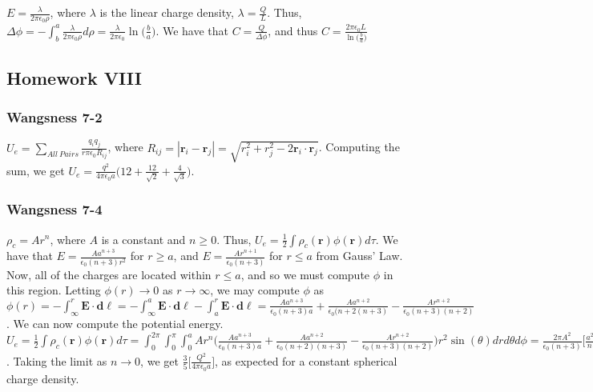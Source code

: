 \documentclass[oneside]{book}
\theoremstyle{definition}
\newcommand*\B[1]{\mathbf{#1}}
\begin{document}
$E=\frac{\lambda}{2\pi \epsilon_0 \rho}$, where $\lambda$ is the linear charge density, $\lambda = \frac{Q}{L}$. Thus, $\Delta\phi = - \int_{b}^{a} \frac{\lambda}{2\pi \epsilon_0\rho}d\rho = \frac{\lambda}{2\pi \epsilon_0}\ln\big(\frac{b}{a}\big)$. We have that $C=\frac{Q}{\Delta\phi}$, and thus $C = \frac{2\pi \epsilon_0 L}{\ln\big(\frac{b}{a}\big)}$


\subsection*{Homework VIII}

\subsubsection{Wangsness 7-2}

$U_e = \underset{All\ Pairs}\sum\frac{q_i q_j}{r\pi \epsilon_0 R_{ij}}$, where $R_{ij} = |\B{r}_i-\B{r}_j| = \sqrt{r_i^2+r_j^2 -2\B{r}_i\cdot \B{r}_j}$. Computing the sum, we get $U_e = \frac{q^2}{4\pi \epsilon_0 a}\big(12 + \frac{12}{\sqrt{2}}+\frac{4}{\sqrt{3}}\big)$.

\begin{figure}[!h]
  \centering
\end{figure}

\subsubsection{Wangsness 7-4}

$\rho_c = Ar^n$, where $A$ is a constant and $n\geq 0$. Thus, $U_e = \frac{1}{2} \int \rho_c(\B{r})\phi(\B{r})d\tau$. We have that $E = \frac{Aa^{n+3}}{\epsilon_0 (n+3)r^2}$ for $r\geq a$, and $E=\frac{Ar^{n+1}}{\epsilon_0(n+3)}$ for $r\leq a$ from Gauss' Law. Now, all of the charges are located within $r\leq a$, and so we must compute $\phi$ in this region. Letting $\phi(r)\rightarrow 0$ as $r\rightarrow \infty$, we may compute $\phi$ as $\phi(r) = -\int_{\infty}^{r}\B{E}\cdot \B{d\ell} = -\int_{\infty}^{a} \B{E}\cdot \B{d\ell} - \int_{a}^{r}\B{E}\cdot \B{d\ell} = \frac{Aa^{n+3}}{\epsilon_0(n+3)a}+\frac{Aa^{n+2}}{\epsilon_0(n+2(n+3)}-\frac{Ar^{n+2}}{\epsilon_0(n+3)(n+2)}$. We can now compute  the potential energy. $U_e =\frac{1}{2}\int \rho_c(\B{r})\phi(\B{r})d\tau = \int_{0}^{2\pi} \int_{0}^{\pi}\int_{0}^{a} A r^n \bigg(\frac{Aa^{n+3}}{\epsilon_0(n+3)a}+\frac{Aa^{n+2}}{\epsilon_0(n+2)(n+3)}-\frac{Ar^{n+2}}{\epsilon_0(n+3)(n+2)}\bigg)r^2 \sin(\theta)dr d\theta d\phi = \frac{2\pi A^2}{\epsilon_0 (n+3)}\bigg[\frac{a^{2n+5}}{n+3}+\frac{a^{2n+5}}{(n+2)(n+3)}-\frac{a^{2n+5}}{(n+2)(2n+5)}\bigg]$. Taking the limit as $n\rightarrow 0$, we get $\frac{3}{5}\bigg[\frac{Q^2}{4\pi \epsilon_0 a}\bigg]$, as expected for a constant spherical charge density.
\end{document}
